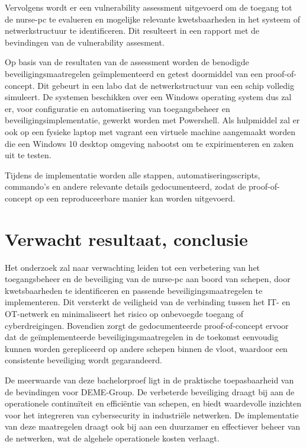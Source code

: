 Vervolgens wordt er een vulnerability assessment uitgevoerd om de toegang tot de nurse-pc te evalueren en mogelijke relevante kwetsbaarheden in het systeem 
of netwerkstructuur te identificeren. Dit resulteert in een rapport met de bevindingen van de vulnerability assesment.

Op basis van de resultaten van de assessment worden de benodigde beveiligingsmaatregelen geïmplementeerd en getest doormiddel van een proof-of-concept. 
Dit gebeurt in een labo dat de netwerkstructuur van een schip volledig simuleert. De systemen beschikken over een Windows operating system dus zal er, voor configuratie en automatisering van toegangsbeheer en beveiligingsimplementatie, gewerkt worden met Powershell. 
Als hulpmiddel zal er ook op een fysieke laptop met vagrant een virtuele machine aangemaakt worden die een Windows 10 desktop omgeving nabootst om te expirimenteren en zaken uit te testen.

Tijdens de implementatie worden alle stappen, automatiseringsscripts, commando's en andere relevante details gedocumenteerd, 
zodat de proof-of-concept op een reproduceerbare manier kan worden uitgevoerd.


\section{Verwacht resultaat, conclusie}%
\label{sec:verwachte_resultaten}
Het onderzoek zal naar verwachting leiden tot een verbetering van het toegangsbeheer en de beveiliging van de nurse-pc aan boord van schepen,
door kwetsbaarheden te identificeren en passende beveiligingsmaatregelen te implementeren. Dit versterkt de veiligheid
van de verbinding tussen het IT- en OT-netwerk en minimaliseert het risico op onbevoegde toegang of cyberdreigingen. 
Bovendien zorgt de gedocumenteerde proof-of-concept ervoor dat de geïmplementeerde beveiligingsmaatregelen in de toekomst eenvoudig kunnen 
worden gerepliceerd op andere schepen binnen de vloot, waardoor een consistente beveiliging wordt gegarandeerd.

De meerwaarde van deze bachelorproef ligt in de praktische toepasbaarheid van de bevindingen voor DEME-Group.
De verbeterde beveiliging draagt bij aan de operationele continuïteit en efficiëntie 
van schepen, en biedt waardevolle inzichten voor het integreren van cybersecurity in industriële netwerken. De implementatie 
van deze maatregelen draagt ook bij aan een duurzamer en effectiever beheer van de netwerken, wat de algehele operationele kosten 
verlaagt.


